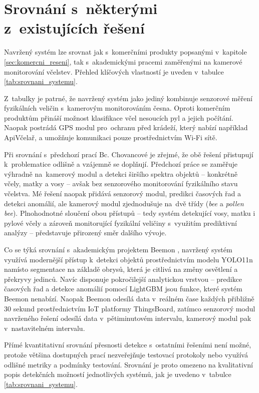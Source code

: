 \section{Srovnání s~některými z~existujících řešení}
Navržený systém lze srovnat jak s~komerčními produkty popsanými v~kapitole \ref{sec:komercni_reseni}, tak s~akademickými pracemi zaměřenými na kamerové monitorování včelstev. Přehled klíčových vlastností je uveden v~tabulce \ref{tab:srovnani_systemu}.

Z~tabulky je patrné, že navržený systém jako jediný kombinuje senzorové měření fyzikálních veličin s~kamerovým monitorováním česna. Oproti komerčním produktům přináší možnost klasifikace včel nesoucích pyl a jejich počítání. Naopak postrádá GPS modul pro~ochranu před krádeží, který nabízí například ApiVčelař, a umožňuje komunikaci pouze prostřednictvím Wi-Fi sítě. 

Při srovnání s~předchozí prací Bc. Chovancové \cite{Chovancova2025} je zřejmé, že obě řešení přistupují k~problematice odlišně a vzájemně se doplňují. Předchozí práce se zaměřuje výhradně na~kamerový modul a detekci širšího spektra objektů -- konkrétně včely, matky a vosy -- avšak bez senzorového monitorování fyzikálního stavu včelstva. Mé řešení naopak přidává senzorový modul, predikci časových řad a detekci anomálií, ale kamerový modul zjednodušuje na~dvě třídy (\textit{bee} a \textit{pollen bee}). Plnohodnotné sloučení obou přístupů -- tedy systém detekující vosy, matku i pylové včely a zároveň monitorující fyzikální veličiny s~využitím prediktivní analýzy -- představuje přirozený směr dalšího vývoje.

Co se týká srovnání s~akademickým projektem Beemon \cite{Beemon2021}, navržený systém využívá modernější přístup k~detekci objektů prostřednictvím modelu YOLO11n namísto segmentace na základě obrysů, která je citlivá na změny osvětlení a překryvy jedinců. Navíc disponuje pokročilejší analytickou vrstvou -- predikce časových řad a detekce anomálií pomocí LightGBM jsou funkce, které systém Beemon nenabízí. Naopak Beemon odesílá data v~reálném čase každých přibližně 30 sekund prostřednictvím IoT platformy ThingsBoard, zatímco senzorový modul navrženého řešení odesílá data v~pětiminutovém intervalu, kamerový modul pak v~nastavitelném intervalu.

Přímé kvantitativní srovnání přesnosti detekce s~ostatními řešeními není možné, protože většina dostupných prací nezveřejňuje testovací protokoly nebo využívá odlišné metriky a podmínky testování. Srovnání je proto omezeno na kvalitativní popis detekčních možností jednotlivých systémů, jak je uvedeno v~tabulce \ref{tab:srovnani_systemu}.

